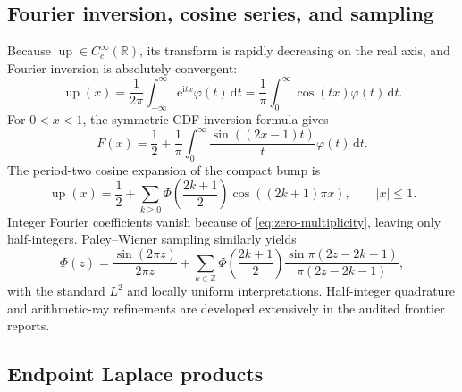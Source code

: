 \documentclass[11pt,oneside]{article}
\theoremstyle{definition}
\newcommand{\dd}{\,\mathrm d}
\newcommand{\e}{\mathrm e}
\newcommand{\ii}{\mathrm i}
\newcommand{\R}{\mathbb R}
\newcommand{\Z}{\mathbb Z}
\newcommand{\Up}{\operatorname{up}}
\newcommand{\PhiF}{\Phi}
\newcommand{\phiF}{\varphi}
\begin{document}
\subsection{Fourier inversion, cosine series, and sampling}

Because \(\Up\in C_c^\infty(\R)\), its transform is rapidly decreasing on the real
axis, and Fourier inversion is absolutely convergent:
\begin{equation}
 \Up(x)=\frac1{2\pi}\int_{-\infty}^{\infty}
 \e^{\ii tx}\phiF(t)\dd t
 =\frac1\pi\int_0^\infty\cos(tx)\phiF(t)\dd t.
 \label{eq:up-fourier-inversion}
\end{equation}
For \(0<x<1\), the symmetric CDF inversion formula gives
\begin{equation}
 F(x)=\frac12+\frac1\pi\int_0^\infty
 \frac{\sin((2x-1)t)}{t}\phiF(t)\dd t.
 \label{eq:F-sine-inversion}
\end{equation}
The period-two cosine expansion of the compact bump is
\begin{equation}
 \Up(x)=\frac12+
 \sum_{k\ge0}\PhiF\!\left(\frac{2k+1}{2}\right)
 \cos((2k+1)\pi x),\qquad |x|\le1.
 \label{eq:half-integer-cosine}
\end{equation}
Integer Fourier coefficients vanish because of \eqref{eq:zero-multiplicity}, leaving
only half-integers.  Paley--Wiener sampling similarly yields
\begin{equation}
 \PhiF(z)=\frac{\sin(2\pi z)}{2\pi z}+
 \sum_{k\in\Z}\PhiF\!\left(\frac{2k+1}{2}\right)
 \frac{\sin\pi(2z-2k-1)}{\pi(2z-2k-1)},
 \label{eq:shannon}
\end{equation}
with the standard \(L^2\) and locally uniform interpretations.  Half-integer
quadrature and arithmetic-ray refinements are developed extensively in the audited
frontier reports.

\subsection{Endpoint Laplace products}
\end{document}
